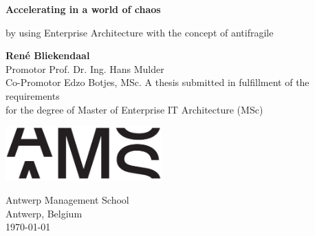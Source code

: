 \begin{titlepage}
	\begin{center}
		\vspace*{1cm}
		
		\Huge
		\textbf{Accelerating in a world of chaos}
		
		\vspace{0.5cm}
		\large
		
		by using Enterprise Architecture with the concept of antifragile
		
		\vspace{1.5cm}
		\Large
		\textbf{René Bliekendaal}\\
		\vspace{0.8cm}
		Promotor Prof. Dr. Ing. Hans Mulder\\
		Co-Promotor Edzo Botjes, MSc.		
		\vfill
		\large
		A thesis submitted in fulfillment of the requirements\\
		for the degree of Master of Enterprise IT Architecture (MSc)
		
		\vspace{0.8cm}
	
			\includegraphics[width=6cm]{images/ams-logo}
		
		\vspace{0.8cm}
		
		\Large
		Antwerp Management School\\
		Antwerp, Belgium\\
		\today
	\end{center}
\end{titlepage}